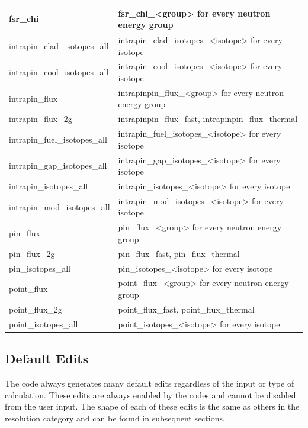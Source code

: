 \begin{table}[h]
\begin{tabular}{|l|p{}|}
    fsr\_chi & fsr\_chi\_<group> for every neutron energy group \\\hline
    intrapin\_clad\_isotopes\_all & intrapin\_clad\_isotopes\_<isotope> for every isotope \\\hline
    intrapin\_cool\_isotopes\_all & intrapin\_cool\_isotopes\_<isotope> for every isotope \\\hline
    intrapin\_flux & intrapinpin\_flux\_<group> for every neutron energy group \\\hline
    intrapin\_flux\_2g & intrapinpin\_flux\_fast, intrapinpin\_flux\_thermal \\\hline
    intrapin\_fuel\_isotopes\_all & intrapin\_fuel\_isotopes\_<isotope> for every isotope \\\hline
    intrapin\_gap\_isotopes\_all & intrapin\_gap\_isotopes\_<isotope> for every isotope \\\hline
    intrapin\_isotopes\_all & intrapin\_isotopes\_<isotope> for every isotope \\\hline
    intrapin\_mod\_isotopes\_all & intrapin\_mod\_isotopes\_<isotope> for every isotope \\\hline
    pin\_flux & pin\_flux\_<group> for every neutron energy group \\\hline
    pin\_flux\_2g & pin\_flux\_fast, pin\_flux\_thermal \\\hline
    pin\_isotopes\_all & pin\_isotopes\_<isotope> for every isotope \\\hline
    point\_flux & point\_flux\_<group> for every neutron energy group \\\hline
    point\_flux\_2g & point\_flux\_fast, point\_flux\_thermal \\\hline
    point\_isotopes\_all & point\_isotopes\_<isotope> for every isotope \\\hline
    \end{tabular}
\end{table}

\FloatBarrier

\subsection{Default Edits}\label{sec:default-edits}

The code always generates many default edits regardless of the input or type of calculation.  These edits are always enabled by the codes and cannot be disabled from the user input.  The shape of each of these edits is the same as others in the resolution category and can be found in subsequent sections.

